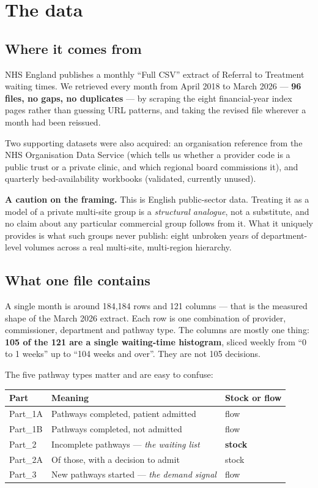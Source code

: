 \documentclass[11pt,a4paper]{article}
\newcommand{\keypoint}[1]{%
  \par\vspace{0.4em}%
  \noindent\colorbox{fed!8}{\parbox{0.98\textwidth}{\vspace{0.2em}#1\vspace{0.2em}}}%
  \par\vspace{0.4em}}
\begin{document}
\section{The data}

\subsection{Where it comes from}

NHS England publishes a monthly ``Full CSV'' extract of Referral to Treatment waiting times. We
retrieved every month from April 2018 to March 2026 --- \textbf{96 files, no gaps, no duplicates} ---
by scraping the eight financial-year index pages rather than guessing URL patterns, and taking the
revised file wherever a month had been reissued.

Two supporting datasets were also acquired: an organisation reference from the NHS Organisation Data
Service (which tells us whether a provider code is a public trust or a private clinic, and which
regional board commissions it), and quarterly bed-availability workbooks (validated, currently
unused).

\keypoint{\textbf{A caution on the framing.} This is English public-sector data. Treating it as a model
of a private multi-site group is a \emph{structural analogue}, not a substitute, and no claim about any
particular commercial group follows from it. What it uniquely provides is what such groups never
publish: eight unbroken years of department-level volumes across a real multi-site, multi-region
hierarchy.}

\subsection{What one file contains}

A single month is around 184{,}184 rows and 121 columns --- that is the measured shape of the March
2026 extract. Each row is one combination of provider,
commissioner, department and pathway type. The columns
are mostly one thing: \textbf{105 of the 121 are a single waiting-time histogram}, sliced weekly from
``0 to 1 weeks'' up to ``104 weeks and over''. They are not 105 decisions.

The five pathway types matter and are easy to confuse:

\begin{center}
\begin{tabular}{@{}lll@{}}
\toprule
\textbf{Part} & \textbf{Meaning} & \textbf{Stock or flow} \\
\midrule
Part\_1A & Pathways completed, patient admitted & flow \\
Part\_1B & Pathways completed, not admitted & flow \\
Part\_2 & Incomplete pathways --- \emph{the waiting list} & \textbf{stock} \\
Part\_2A & Of those, with a decision to admit & stock \\
Part\_3 & New pathways started --- \emph{the demand signal} & flow \\
\bottomrule
\end{tabular}
\end{center}
\end{document}
